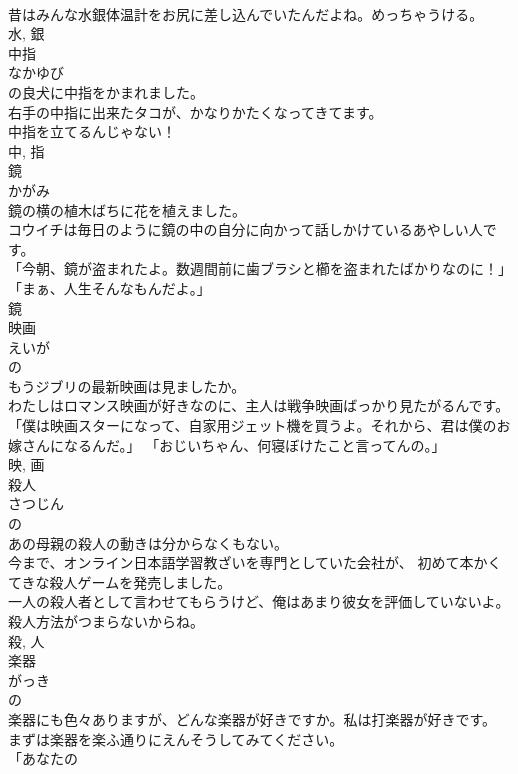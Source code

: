 \documentclass[8pt]{extreport}
\begin{document}
\begin{CJK}{UTF8}{min}
\\	昔はみんな水銀体温計をお尻に差し込んでいたんだよね。めっちゃうける。	
\\	水, 銀	
\\	中指	
\\	なかゆび	
\\	の良犬に中指をかまれました。	
\\	右手の中指に出来たタコが、かなりかたくなってきてます。	
\\	中指を立てるんじゃない！	
\\	中, 指	
\\	鏡	
\\	かがみ	
\\	鏡の横の植木ばちに花を植えました。	
\\	コウイチは毎日のように鏡の中の自分に向かって話しかけているあやしい人です。	
\\	「今朝、鏡が盗まれたよ。数週間前に歯ブラシと櫛を盗まれたばかりなのに！」「まぁ、人生そんなもんだよ。」	
\\	鏡	
\\	映画	
\\	えいが	
\\	の 
\\	もうジブリの最新映画は見ましたか。	
\\	わたしはロマンス映画が好きなのに、主人は戦争映画ばっかり見たがるんです。	
\\	「僕は映画スターになって、自家用ジェット機を買うよ。それから、君は僕のお嫁さんになるんだ。」 「おじいちゃん、何寝ぼけたこと言ってんの。」	
\\	映, 画	
\\	殺人	
\\	さつじん	
\\	の 
\\	あの母親の殺人の動きは分からなくもない。	
\\	今まで、オンライン日本語学習教ざいを専門としていた会社が、 初めて本かくてきな殺人ゲームを発売しました。	
\\	一人の殺人者として言わせてもらうけど、俺はあまり彼女を評価していないよ。殺人方法がつまらないからね。	
\\	殺, 人	
\\	楽器	
\\	がっき	
\\	の 
\\	楽器にも色々ありますが、どんな楽器が好きですか。私は打楽器が好きです。	
\\	まずは楽器を楽ふ通りにえんそうしてみてください。	
\\	「あなたの

\end{CJK}
\end{document}
